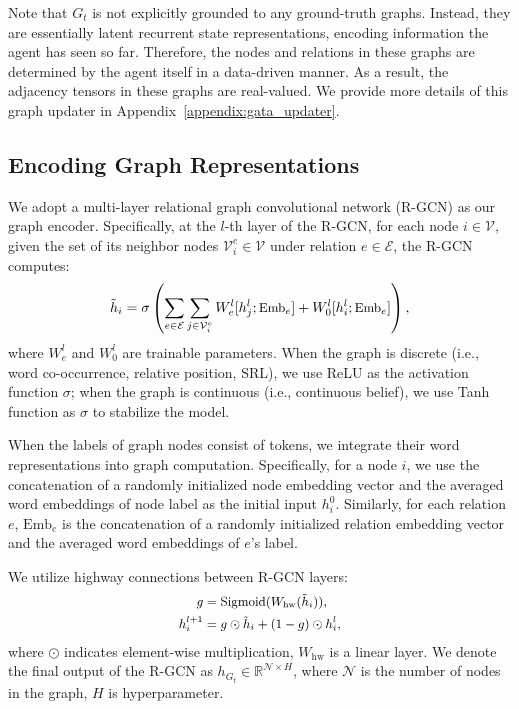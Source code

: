 \documentclass[11pt]{article}
\begin{document}
Note that $G_t$ is not explicitly grounded to any ground-truth graphs. Instead, they are essentially latent recurrent state representations, encoding information the agent has seen so far.
Therefore, the nodes and relations in these graphs are determined by the agent itself in a data-driven manner.
As a result, the adjacency tensors in these graphs are real-valued.
We provide more details of this graph updater in Appendix~\ref{appendix:gata_updater}.

\subsection{Encoding Graph Representations}
\label{subsection:graph_encoder}

We adopt a multi-layer relational graph convolutional network (R-GCN) \citep{schlichtkrull2018rgcn,adhikari2020gata} as our graph encoder.
Specifically, at the $l$-th layer of the R-GCN, for each node $i \in \mathcal{V}$, given the set of its neighbor nodes $\mathcal{V}^e_i \in \mathcal{V}$ under relation $e \in \mathcal{E}$, the R-GCN computes:
\begin{equation}
    \small
    \tilde{h}_i = \sigma\left(\sum_{e\in \mathcal{E}}\sum_{j\in \mathcal{V}^e_i} W^{l}_e [h^{l}_j; \text{Emb}_e] + W^{l}_0 [h^{l}_i; \text{Emb}_e]\right),
\end{equation}
where $W^{l}_e$ and $W^{l}_0$ are trainable parameters.
When the graph is discrete (i.e., word co-occurrence, relative position, SRL), we use ReLU as the activation function $\sigma$; when the graph is continuous (i.e., continuous belief), we use Tanh function as $\sigma$ to stabilize the model.

When the labels of graph nodes consist of tokens, we integrate their word representations into graph computation.
Specifically, for a node $i$, we use the concatenation of a randomly initialized node embedding vector and the averaged word embeddings of node label as the initial input $h_i^{0}$.
Similarly, for each relation $e$, $\text{Emb}_e$ is the concatenation of a randomly initialized relation embedding vector and the averaged word embeddings of $e$'s label.

We utilize highway connections \citep{srivastava15highway} between R-GCN layers:
\begin{equation}
\small
\begin{aligned}
    g &= \text{Sigmoid}(W_{\text{hw}}(\tilde{h}_i)), \\
    h^{l+1}_i &= g \odot \tilde{h}_i + (1 - g) \odot h^{l}_i, \\
\end{aligned}
\end{equation}
where $\odot$ indicates element-wise multiplication, $W_{\text{hw}}$ is a linear layer.
We denote the final output of the R-GCN as $h_{G_t} \in \mathbb{R}^{\mathcal{N} \times H}$, where $\mathcal{N}$ is the number of nodes in the graph, $H$ is hyperparameter.
\end{document}
